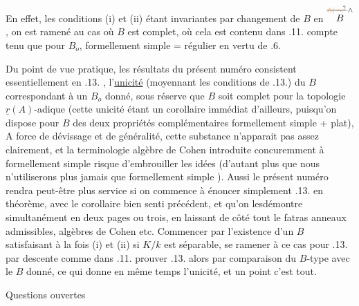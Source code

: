 En effet, les conditions (i) et (ii) étant invariantes par changement de $B$ en $\overset{\handwritten{\deleted{\unsure{\wedge|\sim}}\,\wedge}}{B}$, on est ramené au cas où $B$ est complet, où cela est contenu dans .11.  compte tenu que pour $B_o$, formellement simple =  régulier en vertu de .6.

Du point de vue pratique, les résultats du présent numéro consistent essentiellement en .13. ,  l'\uline{unicité}  (moyennant les conditions de .13.) du $B$ correspondant à un $B_o$ donné, sous réserve que $B$ soit complet pour la topologie $\underline{r}(A)$-adique (cette  unicité étant un corollaire immédiat d'ailleurs, puisqu'on dispose pour $B$ des deux propriétés complémentaires formellement simple + plat),  A force de dévissage et de généralité, cette substance n'apparait pas assez clairement, et la terminologie \textquotedbl{}algèbre de Cohen\textquotedbl{} introduite concuremment à \textquotedbl{}formellement simple\textquotedbl{} risque  d'embrouiller  les idées (d'autant plus que nous n'utiliserons plus jamais que \textquotedbl{}formellement simple\textquotedbl{} ). Aussi le présent numéro rendra peut-être plus service si on commence à énoncer simplement .13. en théorème, avec le corollaire bien senti précédent, et qu'on
lesdémontre simultanément en deux pages ou trois,  en laissant de côté tout le fatras anneaux admissibles, algèbres de Cohen etc.
Commencer par l'existence d'un $B$ satisfaisant à la fois (i) et (ii) si $K/k$ est séparable, se ramener à ce cas pour .13. par descente comme dans .11. prouver .13. alors par comparaison du $B$-type avec le $B$ donné, ce qui donne en même temps l'unicité, et un point c'est tout.


Questions ouvertes

